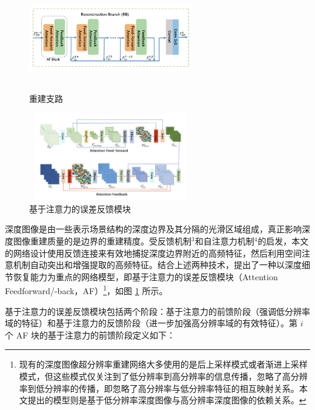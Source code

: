 \documentclass{vip-theme}
\begin{document}
\begin{figure}[!htbp]
	\begin{minipage}[t]{0.5\linewidth}
		\centering
		\includegraphics[height=1.5in,width=2.8in]{figure/RB}
		\caption{重建支路}
		\label{fig:RB}
	\end{minipage}
	\begin{minipage}[t]{0.5\linewidth}
		\centering
		\includegraphics[height=1.5in,width=2.8in]{figure/AF}
		\caption{基于注意力的误差反馈模块 }
		\label{fig:AF}
	\end{minipage}
\end{figure}

深度图像是由一些表示场景结构的深度边界及其分隔的光滑区域组成，真正影响深度图像重建质量的是边界的重建精度。受反馈机制$^3$和自注意力机制$^4$的启发，本文的网络设计使用反馈连接来有效地捕捉深度边界附近的高频特征，然后利用空间注意机制自动突出和增强提取的高频特征。结合上述两种技术，提出了一种以深度细节恢复能力为重点的网络模型，即基于注意力的误差反馈模块（Attention Feedforward/-back，AF）\footnote{现有的深度图像超分辨率重建网络大多使用的是后上采样模式或者渐进上采样模式，但这些模式仅关注到了低分辨率到高分辨率的信息传播，忽略了高分辨率到低分辨率的传播，即忽略了高分辨率与低分辨率特征的相互映射关系。本文提出的模型则是基于低分辨率深度图像与高分辨率深度图像的依赖关系。}，如图 \ref{fig:AF} 所示。

基于注意力的误差反馈模块包括两个阶段：基于注意力的前馈阶段（强调低分辨率域的特征）和基于注意力的反馈阶段（进一步加强高分辨率域的有效特征）。第 $i$ 个 AF 块的基于注意力的前馈阶段定义如下：
\end{document}
